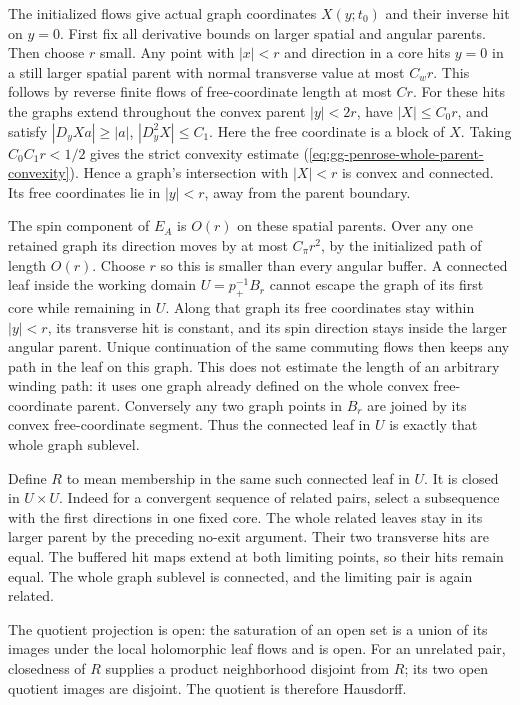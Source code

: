 \documentclass[
  english,
  11pt,
  reqno]{amsart}
\begin{document}
The initialized flows give actual graph coordinates \(X(y;t_0)\) and
their inverse hit on \(y=0\). First fix all derivative bounds on larger
spatial and angular parents. Then choose \(r\) small. Any point with
\(|x|<r\) and direction in a core hits \(y=0\) in a still larger spatial
parent with normal transverse value at most \(C_wr\). This follows by
reverse finite flows of free-coordinate length at most \(Cr\). For these
hits the graphs extend throughout the convex parent \(|y|<2r\), have
\(|X|\le C_0r\), and satisfy \(|D_yX a|\ge|a|\), \(|D_y^2X|\le C_1\).
Here the free coordinate is a block of \(X\). Taking \(C_0C_1r<1/2\)
gives the strict convexity estimate
(\ref{eq:gg-penrose-whole-parent-convexity}). Hence a graph's
intersection with \(|X|<r\) is convex and connected. Its free
coordinates lie in \(|y|<r\), away from the parent boundary.

The spin component of \(E_A\) is \(O(r)\) on these spatial parents. Over
any one retained graph its direction moves by at most \(C_\pi r^2\), by
the initialized path of length \(O(r)\). Choose \(r\) so this is smaller
than every angular buffer. A connected leaf inside the working domain
\(U=p_+^{-1}B_r\) cannot escape the graph of its first core while
remaining in \(U\). Along that graph its free coordinates stay within
\(|y|<r\), its transverse hit is constant, and its spin direction stays
inside the larger angular parent. Unique continuation of the same
commuting flows then keeps any path in the leaf on this graph. This does
not estimate the length of an arbitrary winding path: it uses one graph
already defined on the whole convex free-coordinate parent. Conversely
any two graph points in \(B_r\) are joined by its convex free-coordinate
segment. Thus the connected leaf in \(U\) is exactly that whole graph
sublevel.

Define \(R\) to mean membership in the same such connected leaf in
\(U\). It is closed in \(U\times U\). Indeed for a convergent sequence
of related pairs, select a subsequence with the first directions in one
fixed core. The whole related leaves stay in its larger parent by the
preceding no-exit argument. Their two transverse hits are equal. The
buffered hit maps extend at both limiting points, so their hits remain
equal. The whole graph sublevel is connected, and the limiting pair is
again related.

The quotient projection is open: the saturation of an open set is a
union of its images under the local holomorphic leaf flows and is open.
For an unrelated pair, closedness of \(R\) supplies a product
neighborhood disjoint from \(R\); its two open quotient images are
disjoint. The quotient is therefore Hausdorff.
\end{document}
